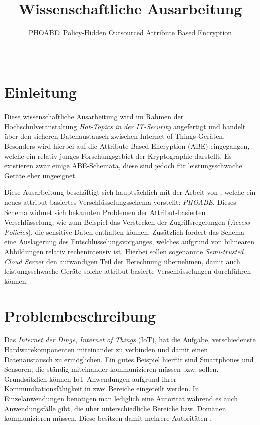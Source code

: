 \documentclass{hsflensburg}
\title{Wissenschaftliche Ausarbeitung}
\subtitle{PHOABE: Policy-Hidden Outsourced Attribute Based Encryption}
\author{
	\name{Florian Hansen}\\
  \institution{Hochschule Flensburg}
}
\begin{document}
	\maketitle
	\begin{abstract}
	\end{abstract}

	\section{Einleitung}
	Diese wissenschaftliche Ausarbeitung wird im Rahmen der Hochschulveranstaltung
	\textit{Hot-Topics in der IT-Security} angefertigt und handelt über den
	sicheren Datenaustausch zwischen Internet-of-Things-Geräten.  Besonders wird
	hierbei auf die Attribute Based Encryption (ABE) eingegangen, welche ein
	relativ junges Forschungsgebiet der Kryptographie darstellt. Es existieren
	zwar einige ABE-Schemata, diese sind jedoch für leistungsschwache Geräte eher
	ungeeignet.

	Diese Ausarbeitung beschäftigt sich hauptsächlich mit der Arbeit von
	\cite{phoabe}, welche ein neues attribut-basiertes Verschlüsselungsschema
	vorstellt: \textit{PHOABE}. Dieses Schema widmet sich bekannten Problemen der
	Attribut-basierten Verschlüsselung, wie zum Beispiel das Verstecken der
	Zugriffsregelungen (\textit{Access-Policies}), die sensitive Daten enthalten
	können. Zusätzlich fordert das Schema eine Auslagerung des
	Entschlüsselungsvorganges, welches aufgrund von bilinearen Abbildungen relativ
	rechenintensiv ist. Hierbei sollen sogenannte \textit{Semi-trusted Cloud
	Server} den aufwändigen Teil der Berechnung über\-nehmen, damit auch
	leistungsschwache Geräte solche attribut-basierte Ver\-schlüs\-sel\-ung\-en
	durchführen können.

	\section{Problembeschreibung}
	Das \textit{Internet der Dinge}, \textit{Internet of Things} (IoT), hat die
	Aufgabe, verschiedenste Hardwarekomponenten miteinander zu verbinden und damit
	einen Datenaustausch zu ermöglichen. Ein gutes Beispiel hierfür sind
	Smartphones und Sensoren, die ständig miteinander kommunizieren müssen bzw.
	sollen. Grundsätzlich können IoT-Anwendungen aufgrund ihrer
	Kommunikationsfähigkeit in zwei Bereiche eingeteilt werden. In
	Einzelanwendungen be\-nö\-ti\-gen man lediglich eine Autorität während es auch
	Anwendungsfälle gibt, die über unterschiedliche Bereiche bzw. Domänen
	kommunizieren müssen. Diese besitzen damit mehrere Autoritäten \cite{phoabe}.
\end{document}
